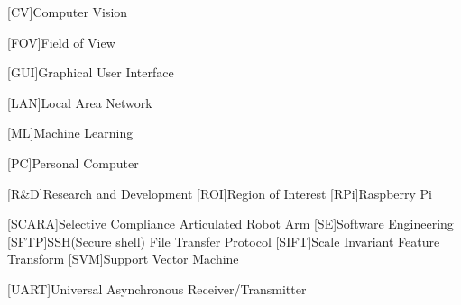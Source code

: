 \begin{acronym}
	[CV]{Computer Vision}
	
	[FOV]{Field of View}
	
	[GUI]{Graphical User Interface}
	
	[LAN]{Local Area Network}
	
	[ML]{Machine Learning}
	
	
	[PC]{Personal Computer}
	
	[R\&D]{Research and Development}
	[ROI]{Region of Interest}
	[RPi]{Raspberry Pi}
			
	[SCARA]{Selective Compliance Articulated Robot Arm}
	[SE]{Software Engineering}
	[SFTP]{SSH(Secure shell) File Transfer Protocol}
	[SIFT]{Scale Invariant Feature Transform}
	[SVM]{Support Vector Machine}
	
	[UART]{Universal Asynchronous Receiver/Transmitter}
\end{acronym}

